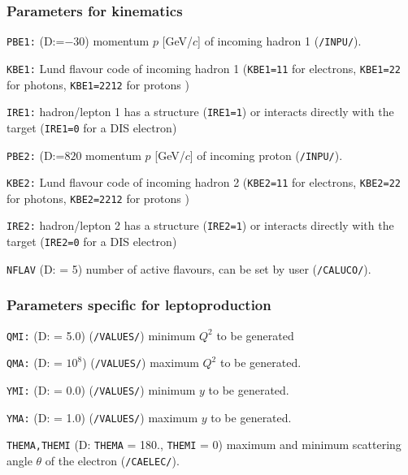 \documentclass[11pt]{article} \usepackage{mystyle-new}
\newcommand{\deflab}[1]{#1\hfil}%
\newenvironment{defl}[1]%
  {\begin{list}{}{\settowidth{\labelwidth}{#1}%
  \setlength{\leftmargin}{\labelwidth}%
  \addtolength{\leftmargin}{\labelsep}%
  \setlength{\itemsep}{0pt plus 1pt}
  \setlength{\parsep}{0pt plus 1pt}
  \setlength{\topsep}{0pt plus 1pt}
  \setlength{\partopsep}{0pt plus 1pt}
  \setlength{\parskip}{2mm plus 1mm minus 1mm}
  \let\makelabel\deflab}}%
  {\end{list}}
\begin{document}
\subsubsection{Parameters for kinematics}
\begin{defl}{123456789012345}
\item[{\tt PBE1:}] 
                     (D:=$-30$)   momentum $p$ [GeV/$c$]
                        of incoming hadron 1 (\verb"/INPU/").
\item[{\tt KBE1:}]  Lund flavour code of incoming hadron 1 (\verb+KBE1=11+
for electrons, \verb+KBE1=22+ for photons, \verb+KBE1=2212+ for protons )
\item[{\tt IRE1:}]   hadron/lepton 1 has a structure (\verb+IRE1=1+) or
interacts directly with the target (\verb+IRE1=0+ for a DIS electron) 
\item[{\tt PBE2:}] 
                     (D:=$820$    momentum $p$ [GeV/$c$]
                        of incoming proton (\verb"/INPU/").
\item[{\tt KBE2:}]  Lund flavour code of incoming hadron 2 (\verb+KBE2=11+
for electrons, \verb+KBE2=22+ for photons, \verb+KBE2=2212+ for protons )
\item[{\tt IRE2:}]   hadron/lepton 2 has a structure (\verb+IRE2=1+) or
interacts directly with the target (\verb+IRE2=0+ for a DIS electron) 
\item[{\tt NFLAV}]  
(D: = 5) number of active flavours, can be set by user 
                    ({\tt /CALUCO/}).

\end{defl}
\subsubsection{Parameters specific for leptoproduction}
\begin{defl}{123456789012345}
\item[{\tt QMI:}]  
       (D: = 5.0) (\verb"/VALUES/") minimum $Q^2$ to be generated 
\item[{\tt QMA:}] 
 (D: = $10^8$) (\verb"/VALUES/") maximum $Q^2$ to be generated.
\item[{\tt YMI:}]  
(D: = 0.0) (\verb"/VALUES/") minimum $y$ to be generated.
\item[{\tt YMA:}]   
(D: = 1.0) (\verb"/VALUES/") maximum $y$ to be generated.
\item[{\tt THEMA,THEMI}] 
  (D: {\tt THEMA} = 180., {\tt THEMI} = 0)
                    maximum and minimum scattering angle $\theta$ of the 
                    electron ({\tt /CAELEC/}).
\end{defl}
\end{document}
